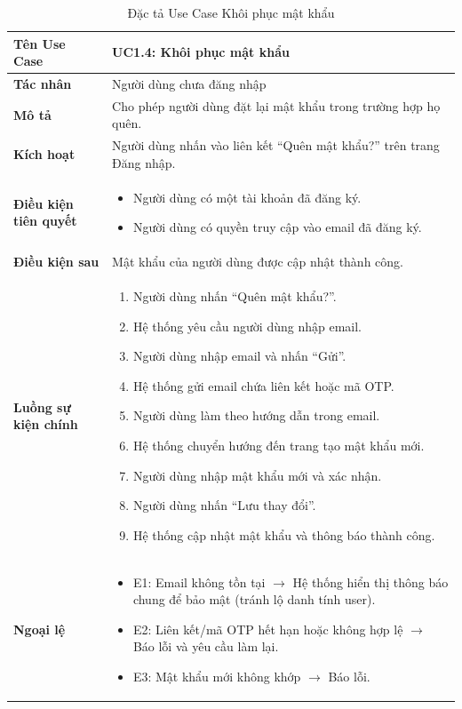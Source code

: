 \begin{table}[H]
\centering
\begin{tabularx}{\textwidth}{|l|X|}
\hline
\textbf{Tên Use Case} & \textbf{UC1.4: Khôi phục mật khẩu} \\ \hline
\textbf{Tác nhân} & Người dùng chưa đăng nhập \\ \hline
\textbf{Mô tả} & Cho phép người dùng đặt lại mật khẩu trong trường hợp họ quên. \\ \hline
\textbf{Kích hoạt} & Người dùng nhấn vào liên kết ``Quên mật khẩu?'' trên trang Đăng nhập. \\ \hline
\textbf{Điều kiện tiên quyết} & 
\begin{itemize}
    \item Người dùng có một tài khoản đã đăng ký.
    \item Người dùng có quyền truy cập vào email đã đăng ký.
\end{itemize} \\ \hline
\textbf{Điều kiện sau} & Mật khẩu của người dùng được cập nhật thành công. \\ \hline
\textbf{Luồng sự kiện chính} & 
\begin{enumerate}
    \item Người dùng nhấn ``Quên mật khẩu?''.
    \item Hệ thống yêu cầu người dùng nhập email.
    \item Người dùng nhập email và nhấn ``Gửi''.
    \item Hệ thống gửi email chứa liên kết hoặc mã OTP.
    \item Người dùng làm theo hướng dẫn trong email.
    \item Hệ thống chuyển hướng đến trang tạo mật khẩu mới.
    \item Người dùng nhập mật khẩu mới và xác nhận.
    \item Người dùng nhấn ``Lưu thay đổi''.
    \item Hệ thống cập nhật mật khẩu và thông báo thành công.
\end{enumerate} \\ \hline
\textbf{Ngoại lệ} & 
\begin{itemize}
    \item E1: Email không tồn tại $\rightarrow$ Hệ thống hiển thị thông báo chung để bảo mật (tránh lộ danh tính user).
    \item E2: Liên kết/mã OTP hết hạn hoặc không hợp lệ $\rightarrow$ Báo lỗi và yêu cầu làm lại.
    \item E3: Mật khẩu mới không khớp $\rightarrow$ Báo lỗi.
\end{itemize} \\ \hline
\end{tabularx}
\caption{Đặc tả Use Case Khôi phục mật khẩu}
\end{table}

